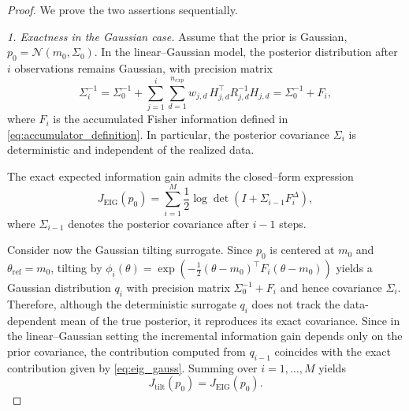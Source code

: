 \documentclass[a4paper,11pt]{article}
\begin{document}
\begin{proof}
We prove the two assertions sequentially.

\noindent\textit{1. Exactness in the Gaussian case.}
Assume that the prior is Gaussian, $p_0=\mathcal N(m_0,\Sigma_0)$.
In the linear--Gaussian model, the posterior distribution after $i$
observations remains Gaussian, with precision matrix
\[
\Sigma_i^{-1}
=
\Sigma_0^{-1}
+
\sum_{j=1}^{i}
\sum_{d=1}^{n_{exp}}
w_{j,d}\, H_{j,d}^\top R_{j,d}^{-1} H_{j,d}
=
\Sigma_0^{-1}+F_i,
\]
where $F_i$ is the accumulated Fisher information defined in \eqref{eq:accumulator_definition}.
In particular, the posterior covariance $\Sigma_i$ is deterministic and
independent of the realized data.

The exact expected information gain admits the closed--form expression
\begin{equation}\label{eq:eig_gauss}
J_{\mathrm{EIG}}(p_0)
=
\sum_{i=1}^M \frac12 \log \det\!\left(I + \Sigma_{i-1} F_i^\Delta \right),
\end{equation}
where $\Sigma_{i-1}$ denotes the posterior covariance after $i-1$ steps.

Consider now the Gaussian tilting surrogate. Since $p_0$ is centered at $m_0$ and
$\theta_{\mathrm{ref}}=m_0$, tilting by
\(
\phi_i(\theta)
=
\exp\!\left(-\tfrac12(\theta-m_0)^\top F_i(\theta-m_0)\right)
\)
yields a Gaussian distribution $q_i$ with precision matrix $\Sigma_0^{-1}+F_i$ and hence
covariance $\Sigma_i$. Therefore, although the deterministic surrogate $q_i$ does not track the
data-dependent mean of the true posterior, it reproduces its exact covariance.
Since in the linear--Gaussian setting the incremental information gain depends
only on the prior covariance, the contribution computed from $q_{i-1}$ coincides
with the exact contribution given by \eqref{eq:eig_gauss}. Summing over
$i=1,\dots,M$ yields
\[
J_{\mathrm{tilt}}(p_0)=J_{\mathrm{EIG}}(p_0).
\]

\medskip


\end{proof}
\end{document}
